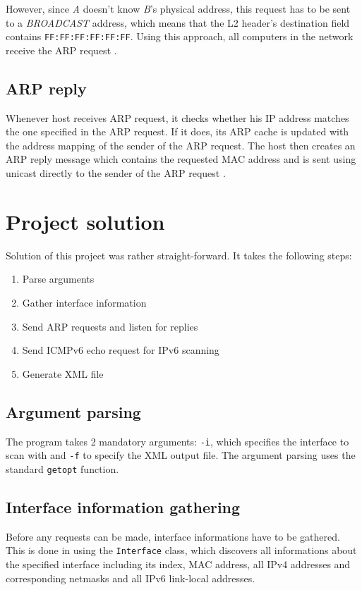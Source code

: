 \documentclass[11pt,a4paper]{article}
\begin{document}
		However, since \emph{A} doesn't know \emph{B}'s physical address, this request has to be sent to a \emph{BROADCAST} address, which means that the L2 header's destination field contains \texttt{FF:FF:FF:FF:FF:FF}. Using this approach, all computers in the network receive the ARP request \cite{microsoft:arp_process}.
	\subsection{ARP reply}
		Whenever host receives ARP request, it checks whether his IP address matches the one specified in the ARP request. If it does, its ARP cache is updated with the address mapping of the sender of the ARP request. The host then creates an ARP reply message which contains the requested MAC address and is sent using unicast directly to the sender of the ARP request \cite{microsoft:arp_process}.
		
\newpage
\section{Project solution}
	Solution of this project was rather straight-forward.
	It takes the following steps:
		\begin{enumerate}
			\item Parse arguments
			\item Gather interface information
			\item Send ARP requests and listen for replies
			\item Send ICMPv6 echo request for IPv6 scanning
			\item Generate XML file
		\end{enumerate}
	
	\subsection{Argument parsing}
		The program takes 2 mandatory arguments: \texttt{-i}, which specifies the interface to scan with and \texttt{-f} to specify the XML output file. The argument parsing uses the standard \texttt{getopt} function.
		
	\subsection{Interface information gathering}
		Before any requests can be made, interface informations have to be gathered. This is done in using the \texttt{Interface} class, which discovers all informations about the specified interface including its index, MAC address, all IPv4 addresses and corresponding netmasks and all IPv6 link-local addresses.
		
\end{document}

